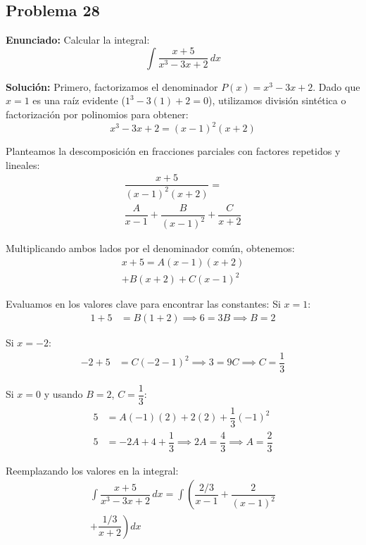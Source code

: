 \subsection*{Problema 28}

\textbf{Enunciado:} Calcular la integral:
\begin{equation*}
\int \dfrac{x + 5}{x^3 - 3x + 2} \, dx
\end{equation*}

\textbf{Solución:} 
Primero, factorizamos el denominador 
$P(x) = x^3 - 3x + 2$. 
Dado que $x = 1$ es una raíz evidente 
($1^3 - 3(1) + 2 = 0$), 
utilizamos división sintética o factorización 
por polinomios para obtener:
\begin{equation*}
x^3 - 3x + 2 = (x - 1)^2 (x + 2)
\end{equation*}

Planteamos la descomposición en 
fracciones parciales con factores 
repetidos y lineales:
\begin{multline*}
\dfrac{x + 5}{(x - 1)^2 (x + 2)} = \\
\dfrac{A}{x - 1} + \dfrac{B}{(x - 1)^2} + \dfrac{C}{x + 2}
\end{multline*}

Multiplicando ambos lados por el 
denominador común, obtenemos:
\begin{multline*}
x + 5 = A(x - 1)(x + 2) \\
+ B(x + 2) + C(x - 1)^2
\end{multline*}

Evaluamos en los valores clave para 
encontrar las constantes:
Si $x = 1$:
\begin{align*}
1 + 5 &= B(1 + 2) \implies 6 = 3B \implies B = 2
\end{align*}

Si $x = -2$:
\begin{align*}
-2 + 5 &= C(-2 - 1)^2 \implies 3 = 9C \implies C = \dfrac{1}{3}
\end{align*}

Si $x = 0$ y usando $B = 2$, $C = \dfrac{1}{3}$:
\begin{align*}
5 &= A(-1)(2) + 2(2) + \dfrac{1}{3}(-1)^2 \\
5 &= -2A + 4 + \dfrac{1}{3} \implies 2A = \dfrac{4}{3} \implies A = \dfrac{2}{3}
\end{align*}

Reemplazando los valores en la integral:
\begin{multline*}
\int \dfrac{x + 5}{x^3 - 3x + 2} \, dx = 
\int \left( \dfrac{2/3}{x - 1} + \dfrac{2}{(x - 1)^2} \right. \\
\left. + \dfrac{1/3}{x + 2} \right) dx
\end{multline*}

